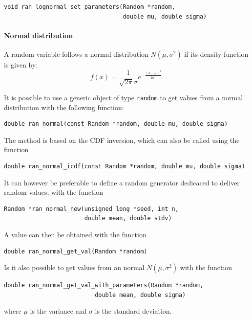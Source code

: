 \begin{verbatim}
void ran_lognormal_set_parameters(Random *random,
                                  double mu, double sigma)
\end{verbatim}


\paragraph{Normal distribution}

A random variable follows a normal distribution $N(\mu, \sigma^2)$ if its density function is given by:
\[
f(x) = \frac{1}{\sqrt{2\pi}\sigma}e^{-\frac{(x-\mu)^2}{2\sigma^2}}.
\]

It is possible to use a generic object of type \verb|random| to get
values from a normal distribution with the following function:
\begin{verbatim}
double ran_normal(const Random *random, double mu, double sigma)
\end{verbatim}
The method is based on the CDF inversion, which can also be called
using the function
\begin{verbatim}
double ran_normal_icdf(const Random *random, double mu, double sigma)
\end{verbatim}

It can however be preferable to define a random generator dedicaced to
deliver random values, with the function
\begin{verbatim}
Random *ran_normal_new(unsigned long *seed, int n,
                       double mean, double stdv)
\end{verbatim}
A value can then be obtained with the function
\begin{verbatim}
double ran_normal_get_val(Random *random)
\end{verbatim}
Is it also possible to get values from an normal $N(\mu,\sigma^2)$
with the function
\begin{verbatim}
double ran_normal_get_val_with_parameters(Random *random,
				          double mean, double sigma)
\end{verbatim}
where $\mu$ is the variance and $\sigma$ is the standard deviation.

